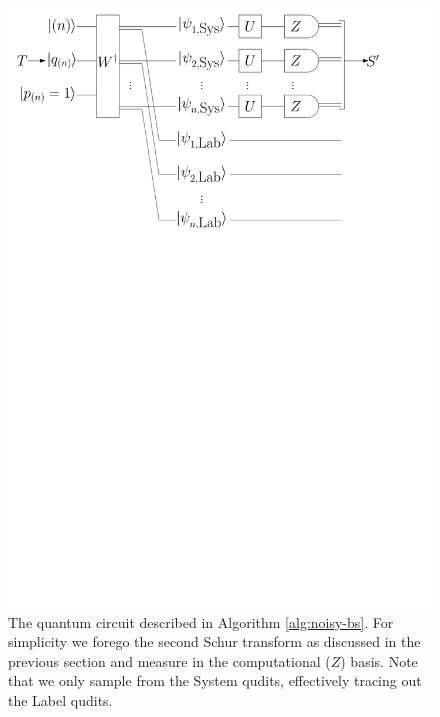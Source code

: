\begin{figure}
\includegraphics[width=\linewidth]{noisy_circuit/noisy_circuit_fig}
\caption[The quantum circuit described in Algorithm \ref{alg:noisy-bs}]{The quantum circuit described in Algorithm \ref{alg:noisy-bs}. 
For simplicity we forego the second Schur transform as discussed in the previous section and measure in the computational ($Z$) basis. 
Note that we only sample from the System qudits, effectively tracing out the Label qudits.}
\label{fig:noisy-bs}
\end{figure}

